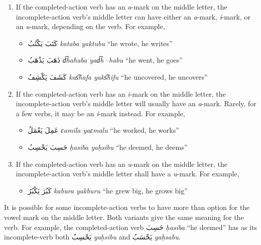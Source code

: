 \documentclass[
  10pt,
]{book}
\providecommand{\tightlist}{%
  \setlength{\itemsep}{0pt}\setlength{\parskip}{0pt}}
\begin{document}
\begin{enumerate}
\def\labelenumi{\arabic{enumi}.}
\item
  If the completed-action verb has an \emph{a}-mark on the middle letter, the incomplete-action verb's middle letter can have either an \emph{a}-mark, \emph{i}-mark, or an \emph{u}-mark, depending on the verb. For example,

  \begin{itemize}
  \tightlist
  \item
    \foreignlanguage{arabic}{کَتَبَ يَکْتُبُ} \emph{kataba yaktubu} \enquote{he wrote, he writes}
  \item
    \foreignlanguage{arabic}{ذَهَبَ يَذْهَبُ} \emph{d͡hahaba yad͡h·habu} \enquote{he went, he goes}
  \item
    \foreignlanguage{arabic}{کَشَفَ يَکْشِفُ} \emph{kas͡hafa yaks͡hifu} \enquote{he uncovered, he uncovers}
  \end{itemize}
\item
  If the completed-action verb has an \emph{i}-mark on the middle letter, the incomplete-action verb's middle letter will usually have an \emph{a}-mark. Rarely, for a few verbs, it may be an \emph{i}-mark instead. For example,

  \begin{itemize}
  \tightlist
  \item
    \foreignlanguage{arabic}{عَمِلَ يَعْمَلُ} \emph{ɛamila yaɛmalu} \enquote{he worked, he works}
  \item
    \foreignlanguage{arabic}{حَسِبَ يَحْسِبُ} \emph{ḥasiba yaḥsibu} \enquote{he deemed, he deems}
  \end{itemize}
\item
  If the completed-action verb has an \emph{u}-mark on the middle letter, the incomplete-action verb's middle letter shall have a \emph{u}-mark. For example,

  \begin{itemize}
  \tightlist
  \item
    \foreignlanguage{arabic}{کَبُرَ يَکْبُرُ} \emph{kabura yakburu} \enquote{he grew big, he grows big}
  \end{itemize}
\end{enumerate}

It is possible for some incomplete-action verbs to have more than option for the vowel mark on the middle letter. Both variants give the same meaning for the verb. For example, the completed-action verb \foreignlanguage{arabic}{حَسِبَ} \emph{ḥasiba} \enquote{he deemed} has as its incomplete-verb both \foreignlanguage{arabic}{يَحْسِبُ} \emph{yaḥsibu} and \foreignlanguage{arabic}{يَحْسَبُ} \emph{yaḥsabu}.
\end{document}
